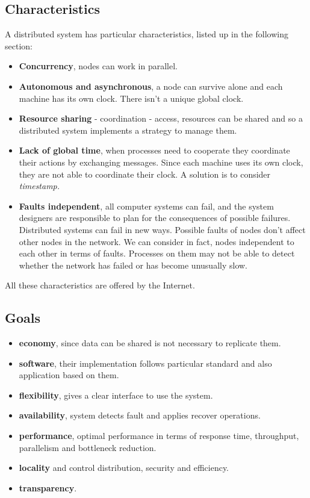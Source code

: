 \documentclass[11pt,a4paper]{article}
\begin{document}
\subsection{Characteristics}
A distributed system has particular characteristics, listed up in the following section:
\begin{itemize}
    \item \textbf{Concurrency}, nodes can work in parallel.
    \item \textbf{Autonomous and asynchronous}, a node can survive alone and each machine has its own clock. There isn't a unique global clock.
    \item \textbf{Resource sharing} - coordination - access, resources can be shared and so a distributed system implements a strategy to manage them. 
    \item \textbf{Lack of global time}, when processes need to cooperate they coordinate their actions by exchanging messages. Since each machine uses its own clock, they are not able to coordinate their clock. A solution is to consider \textit{timestamp.}
    \item \textbf{Faults independent}, all computer systems can fail, and the system designers are responsible to plan for the consequences of possible failures. Distributed systems can fail in new ways. Possible faults of nodes don't affect other nodes in the network. We can consider in fact, nodes independent to each other in terms of faults. Processes
    on them may not be able to detect whether the network has failed or has become
    unusually slow.
\end{itemize}
All these characteristics are offered by the Internet.

\subsection{Goals}
\begin{itemize}
    \item \textbf{economy}, since data can be shared is not necessary to replicate them.
    \item \textbf{software}, their implementation follows particular standard and also application based on them.
    \item \textbf{flexibility}, gives a clear interface to use the system.
    \item \textbf{availability}, system detects fault and applies recover operations.
    \item \textbf{performance}, optimal performance in terms of response time, throughput, parallelism and bottleneck reduction.
    \item \textbf{locality} and control distribution, security and efficiency.
    \item \textbf{transparency}.
\end{itemize}
\end{document}
